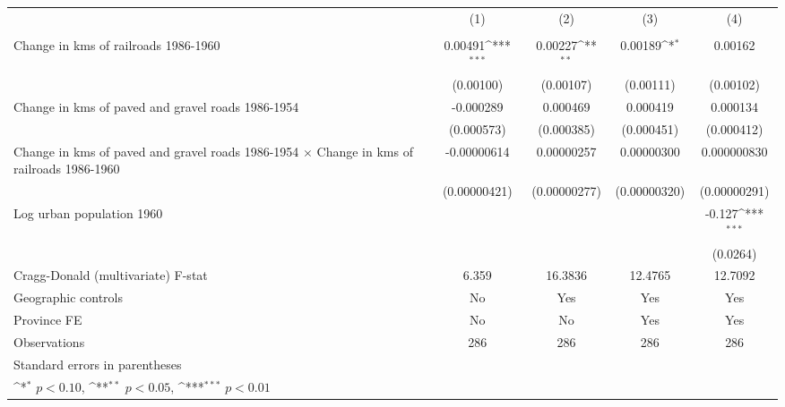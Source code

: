 {
\def\sym#1{\ifmmode^{#1}\else\(^{#1}\)\fi}
\begin{tabular}{l*{4}{c}}
\hline\hline
                &\multicolumn{1}{c}{(1)}&\multicolumn{1}{c}{(2)}&\multicolumn{1}{c}{(3)}&\multicolumn{1}{c}{(4)}\\
                &\multicolumn{1}{c}{}&\multicolumn{1}{c}{}&\multicolumn{1}{c}{}&\multicolumn{1}{c}{}\\
\hline
Change in kms of railroads 1986-1960&  0.00491\sym{***}&  0.00227\sym{**} &  0.00189\sym{*}  &  0.00162         \\
                &(0.00100)         &(0.00107)         &(0.00111)         &(0.00102)         \\
[1em]
Change in kms of paved and gravel roads 1986-1954&-0.000289         & 0.000469         & 0.000419         & 0.000134         \\
                &(0.000573)         &(0.000385)         &(0.000451)         &(0.000412)         \\
[1em]
Change in kms of paved and gravel roads 1986-1954 $\times$ Change in kms of railroads 1986-1960&-0.00000614         &0.00000257         &0.00000300         &0.000000830         \\
                &(0.00000421)         &(0.00000277)         &(0.00000320)         &(0.00000291)         \\
[1em]
Log urban population 1960&                  &                  &                  &   -0.127\sym{***}\\
                &                  &                  &                  & (0.0264)         \\
\hline
Cragg-Donald (multivariate) F-stat&    6.359         &  16.3836         &  12.4765         &  12.7092         \\
Geographic controls&       No         &      Yes         &      Yes         &      Yes         \\
Province FE     &       No         &       No         &      Yes         &      Yes         \\
Observations    &      286         &      286         &      286         &      286         \\
\hline\hline
\multicolumn{5}{l}{\footnotesize Standard errors in parentheses}\\
\multicolumn{5}{l}{\footnotesize \sym{*} \(p<0.10\), \sym{**} \(p<0.05\), \sym{***} \(p<0.01\)}\\
\end{tabular}
}
